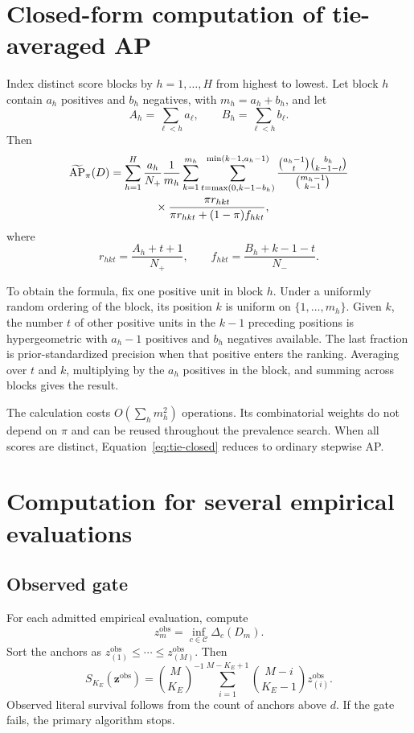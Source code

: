 \documentclass[11pt]{article}
\newcommand{\AP}{\operatorname{AP}}
\newcommand{\CSet}{\mathcal{C}}
\newcommand{\APta}{\widetilde{\AP}}
\theoremstyle{remark}
\begin{document}
\section{Closed-form computation of tie-averaged AP}
\label{app:tie-computation}

Index distinct score blocks by $h=1,\ldots,H$ from highest to lowest. Let block
$h$ contain $a_h$ positives and $b_h$ negatives, with $m_h=a_h+b_h$, and let
\[
A_h=\sum_{\ell<h}a_\ell,
\qquad
B_h=\sum_{\ell<h}b_\ell.
\]
Then
\begin{align}
\APta_\pi(D)
&=
\sum_{h=1}^H
\frac{a_h}{N_+}\frac1{m_h}
\sum_{k=1}^{m_h}
\sum_{t=\max(0,k-1-b_h)}^{\min(k-1,a_h-1)}
\frac{\binom{a_h-1}{t}\binom{b_h}{k-1-t}}
{\binom{m_h-1}{k-1}}
\notag\\
&\qquad\qquad\times
\frac{\pi r_{hkt}}
{\pi r_{hkt}+(1-\pi)f_{hkt}},
\label{eq:tie-closed}
\end{align}
where
\[
r_{hkt}=\frac{A_h+t+1}{N_+},
\qquad
f_{hkt}=\frac{B_h+k-1-t}{N_-}.
\]

To obtain the formula, fix one positive unit in block $h$. Under a uniformly
random ordering of the block, its position $k$ is uniform on
$\{1,\ldots,m_h\}$. Given $k$, the number $t$ of other positive units in the
$k-1$ preceding positions is hypergeometric with $a_h-1$ positives and $b_h$
negatives available. The last fraction is prior-standardized precision when
that positive enters the ranking. Averaging over $t$ and $k$, multiplying by
the $a_h$ positives in the block, and summing across blocks gives the result.

The calculation costs $O(\sum_hm_h^2)$ operations. Its combinatorial weights
do not depend on $\pi$ and can be reused throughout the prevalence search. When
all scores are distinct, Equation~\eqref{eq:tie-closed} reduces to ordinary
stepwise AP.


\section{Computation for several empirical evaluations}
\label{app:computation}

\subsection{Observed gate}

For each admitted empirical evaluation, compute
\[
z_m^{\mathrm{obs}}
=
\inf_{c\in\CSet}\Delta_c(D_m).
\]
Sort the anchors as
$z_{(1)}^{\mathrm{obs}}\leq\cdots\leq z_{(M)}^{\mathrm{obs}}$. Then
\begin{equation}
S_{K_E}(\mathbf z^{\mathrm{obs}})
=
\binom{M}{K_E}^{-1}
\sum_{i=1}^{M-K_E+1}
\binom{M-i}{K_E-1}z_{(i)}^{\mathrm{obs}}.
\label{eq:sorted-observed}
\end{equation}
Observed literal survival follows from the count of anchors above $d$. If the
gate fails, the primary algorithm stops.
\end{document}
